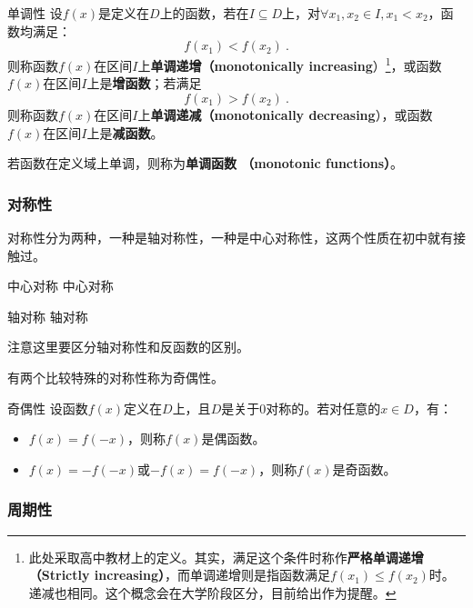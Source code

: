 \begin{definition}{单调性}
设$f(x)$是定义在$D$上的函数，若在$I\subseteq D$上，对$\forall x_1,x_2\in I,x_1< x_2$，函数均满足：
\begin{equation}
f(x_1)<f(x_2)~.
\end{equation}
则称函数$f(x)$在区间$I$上\textbf{单调递增（monotonically increasing}）\footnote{此处采取高中教材上的定义。其实，满足这个条件时称作\textbf{严格单调递增 （Strictly increasing）}，而单调递增则是指函数满足$f(x_1)\leq f(x_2)$时。递减也相同。这个概念会在大学阶段区分，目前给出作为提醒。}，或函数$f(x)$在区间$I$上是\textbf{增函数}；若满足
\begin{equation}
f(x_1)>f(x_2)~.
\end{equation}
则称函数$f(x)$在区间$I$上\textbf{单调递减（monotonically decreasing}），或函数$f(x)$在区间$I$上是\textbf{减函数}。

若函数在定义域上单调，则称为\textbf{单调函数 （monotonic functions）}。
\end{definition}



\subsubsection{对称性}

对称性分为两种，一种是轴对称性，一种是中心对称性，这两个性质在初中就有接触过。

\begin{definition}{中心对称}
中心对称
\end{definition}

\begin{definition}{轴对称}
轴对称
\end{definition}

注意这里要区分轴对称性和反函数的区别。

有两个比较特殊的对称性称为奇偶性。

\begin{definition}{奇偶性}
设函数$f(x)$定义在$D$上，且$D$是关于$0$对称的。若对任意的$x\in D$，有：
\begin{itemize}
\item $f(x)=f(-x)$，则称$f(x)$是偶函数。
\item $f(x)=-f(-x)$或$-f(x)=f(-x)$，则称$f(x)$是奇函数。
\end{itemize}
\end{definition}

\subsubsection{周期性}

